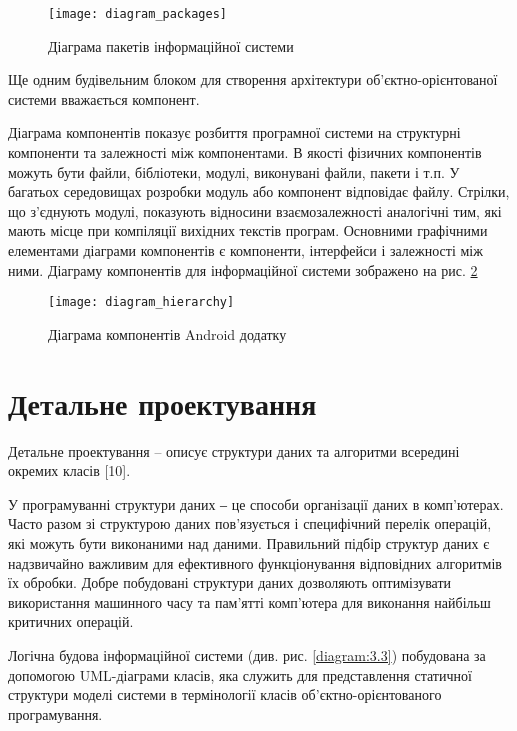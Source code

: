 \documentclass[../main.tex]{subfiles}
\begin{document}

\begin{figure}[H]
	\centering
	\texttt{[image: diagram\_packages]}
	\caption{Діаграма пакетів інформаційної системи}
	\label{diagram:3.1}
\end{figure}

Ще одним будівельним блоком для створення архітектури об'єктно-орієнтованої системи вважається компонент. \cite{diploma_guidelines}

Діаграма компонентів показує розбиття програмної системи на структурні компоненти та залежності між компонентами. В якості фізичних компонентів можуть бути файли, бібліотеки, модулі, виконувані файли, пакети і т.п. У багатьох середовищах розробки модуль або компонент відповідає файлу. Стрілки, що з'єднують модулі, показують відносини взаємозалежності аналогічні тим, які мають місце при компіляції вихідних текстів програм. Основними графічними елементами діаграми компонентів є компоненти, інтерфейси і залежності між ними. Діаграму компонентів для інформаційної системи зображено на рис. \ref{diagram:3.2}

\begin{figure}[H]
	\centering
	\texttt{[image: diagram\_hierarchy]}
	\caption{Діаграма компонентів Android додатку}
	\label{diagram:3.2}
\end{figure}

\section{Детальне проектування}

Детальне проектування – описує структури даних та алгоритми всередині окремих класів [10]. 

У програмуванні структури даних ‒ це способи організації даних в комп’ютерах. Часто разом зі структурою даних пов’язується і специфічний перелік операцій, які можуть бути виконаними над даними.
Правильний підбір структур даних є надзвичайно важливим для ефективного функціонування відповідних алгоритмів їх обробки. Добре побудовані структури даних дозволяють оптимізувати використання машинного часу та пам’ятті комп’ютера для виконання найбільш критичних операцій.

Логічна будова інформаційної системи (див. рис. \ref{diagram:3.3}) побудована  за допомогою UML-діаграми класів, яка служить для представлення статичної структури моделі системи в термінології класів об’єктно-орієнтованого програмування.
\end{document}
